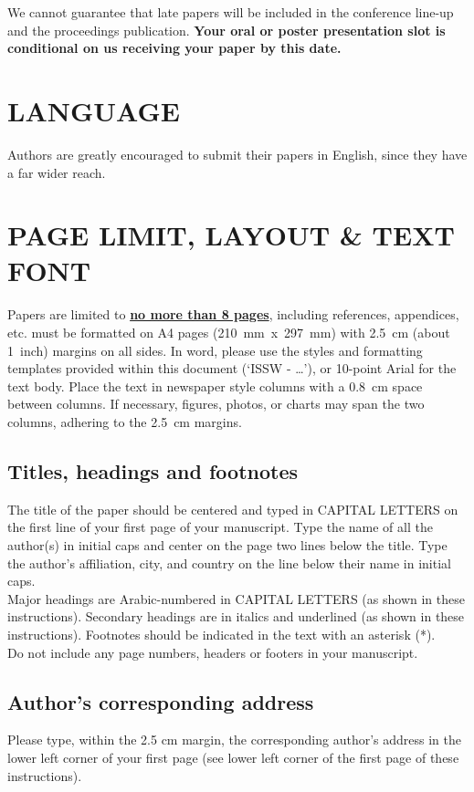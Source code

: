 \documentclass[3p,authoryear,times,twocolumn]{elsarticle_issw2018}
\begin{document}
\noindent
We cannot guarantee that late papers will be included in the conference line-up and the proceedings publication. \textbf{Your oral or poster presentation slot is conditional on us receiving your paper by this date.}
%
\section{LANGUAGE} 
Authors are greatly encouraged to submit their papers in English, since they have a far wider reach.
%
\section{PAGE LIMIT, LAYOUT \& TEXT FONT}
Papers are limited to \textbf{\underline{no more than 8 pages}}, including references, appendices, etc.  must be formatted on A4 pages (210 mm x 297 mm) with 2.5 cm (about 1 inch) margins on all sides. In word, please use the styles and formatting templates provided within this document (‘ISSW - …’), or 10-point Arial for the text body.
Place the text in newspaper style columns with a 0.8 cm space between columns. If necessary, figures, photos, or charts may span the two columns, adhering to the 2.5 cm margins.

%
\subsection{Titles, headings and footnotes}
The title of the paper should be centered and typed in CAPITAL LETTERS on the first line of your first page of your manuscript. Type the name of all the author(s) in initial caps and center on the page two lines below the title. Type the author's affiliation, city, and country on the line below their name in initial caps.\\
%
\noindent
Major headings are Arabic-numbered in CAPITAL LETTERS (as shown in these instructions). Secondary headings are in italics and underlined (as shown in these instructions). Footnotes should be indicated in the text with an asterisk (*).\\
%
\noindent
Do not include any page numbers, headers or footers in your manuscript.
%
\subsection{Author's corresponding address}
Please type, within the 2.5 cm margin, the corresponding author's address in the lower left corner of your first page (see lower left corner of the first page of these instructions).
%
\end{document}
